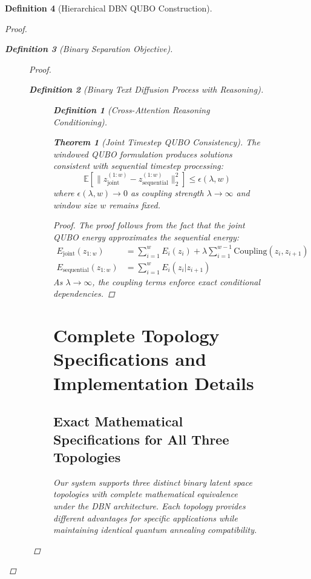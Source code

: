 \documentclass{article}
\newtheorem{theorem}{Theorem}
\newtheorem{definition}{Definition}
\begin{document}
\begin{definition}[Hierarchical DBN QUBO Construction]
\begin{proof}
\begin{definition}[Binary Separation Objective]
\begin{figure}[H]
\begin{proof}
\begin{definition}[Binary Text Diffusion Process with Reasoning]
\begin{figure}[H]
\begin{definition}[Cross-Attention Reasoning Conditioning]
\begin{theorem}[Joint Timestep QUBO Consistency]
The windowed QUBO formulation produces solutions consistent with sequential timestep processing:
\begin{equation}
\mathbb{E}[\|z_{\text{joint}}^{(1:w)} - z_{\text{sequential}}^{(1:w)}\|_2^2] \leq \epsilon(\lambda, w)
\end{equation}
where $\epsilon(\lambda, w) \to 0$ as coupling strength $\lambda \to \infty$ and window size $w$ remains fixed.
\end{theorem}

\begin{proof}
The proof follows from the fact that the joint QUBO energy approximates the sequential energy:
\begin{align}
E_{\text{joint}}(z_{1:w}) &= \sum_{i=1}^w E_i(z_i) + \lambda \sum_{i=1}^{w-1} \text{Coupling}(z_i, z_{i+1})\\
E_{\text{sequential}}(z_{1:w}) &= \sum_{i=1}^w E_i(z_i | z_{i+1})
\end{align}
As $\lambda \to \infty$, the coupling terms enforce exact conditional dependencies.
\end{proof}

\section{Complete Topology Specifications and Implementation Details}

\subsection{Exact Mathematical Specifications for All Three Topologies}

Our system supports three distinct binary latent space topologies with complete mathematical equivalence under the DBN architecture. Each topology provides different advantages for specific applications while maintaining identical quantum annealing compatibility.


\end{definition}
\end{figure}
\end{definition}
\end{proof}
\end{figure}
\end{definition}
\end{proof}
\end{definition}
\end{document}
